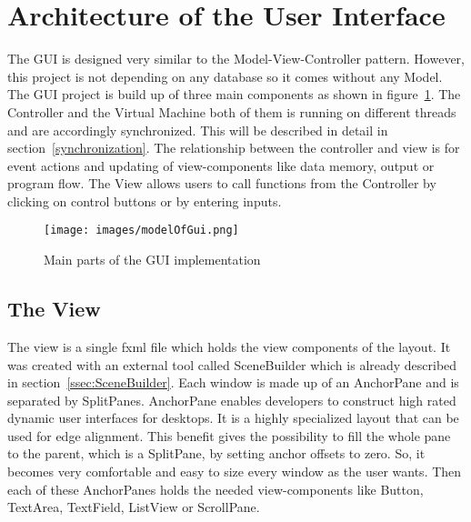 \section{Architecture of the User Interface}
The GUI is designed very similar to the Model-View-Controller pattern. However, this project is not depending on any database so it comes without any Model. The GUI project is build up of three main components as shown in figure~\ref{fig:partsOfGui}. The Controller and the Virtual Machine both of them is running on different threads and are accordingly synchronized. This will be described in detail in section~\ref{synchronization}. The relationship between the controller and view is for event actions and updating of view-components like data memory, output or program flow. The View allows users to call functions from the Controller by clicking on control buttons or by entering inputs. 
\begin{figure}[h] 
	\centering
	\texttt{[image: images/modelOfGui.png]}
	\caption{Main parts of the GUI implementation}
	\label{fig:partsOfGui}
\end{figure}
\subsection{The View}
The view is a single fxml file which holds the view components of the layout. It was created with an external tool called SceneBuilder which is already described in section~\ref{ssec:SceneBuilder}. Each window is made up of an AnchorPane and is separated by SplitPanes. AnchorPane enables developers to construct high rated dynamic user interfaces for desktops. It is a highly specialized layout that can be used for edge alignment. This benefit gives the possibility to fill the whole pane to the parent, which is a SplitPane, by setting anchor offsets to zero. So, it becomes very comfortable and easy to size every window as the user wants. Then each of these AnchorPanes holds the needed view-components like Button, TextArea, TextField, ListView or ScrollPane. 
